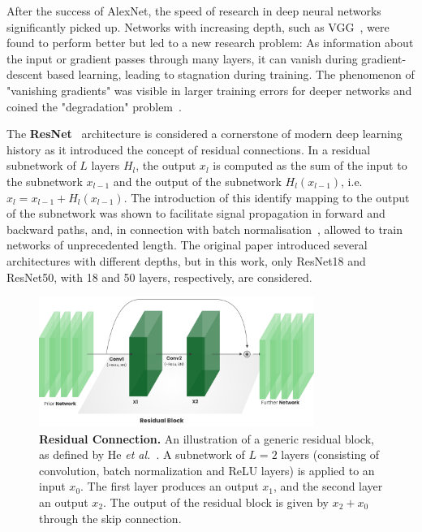 \documentclass[a4paper]{article}
\begin{document}
After the success of AlexNet, the speed of research in deep neural networks
significantly picked up. Networks with increasing depth, such as VGG~\cite{vgg},
were found to perform better  but led to a new research problem: As information
about the input or gradient passes through many layers, it can vanish during
gradient-descent based learning, leading to stagnation during training. The
phenomenon of "vanishing gradients" was visible in larger training errors for
deeper networks and coined the "degradation" problem~\cite{resnet}. 

The \textbf{ResNet}~\cite{resnet} architecture is considered a cornerstone of
modern deep learning history as it introduced the concept of residual
connections. In a residual subnetwork of $L$ layers $H_l$, the output $x_l$ is
computed as the sum of the input to the subnetwork $x_{l-1}$ and the output of
the subnetwork $H_l(x_{l-1})$, i.e. $x_l=x_{l-1}+H_l(x_{l-1})$. The introduction
of this identify mapping to the output of the subnetwork was shown to facilitate
signal propagation in forward and backward paths, and, in connection with batch
normalisation~\cite{batchnorm}, allowed to train networks of unprecedented
length. The original paper introduced several architectures with different
depths, but in this work, only ResNet18 and ResNet50, with 18 and 50 layers,
respectively, are considered.

\begin{figure}
  \centering
  \includegraphics[width=0.8\textwidth]{./figures/resnet.png}
  \caption{\textbf{Residual Connection.} An illustration of a generic residual
    block, as defined by He \textit{et al.}~\cite{resnet}. A subnetwork of $L=2$
    layers (consisting of convolution, batch normalization and ReLU layers) is
    applied to an input $x_0$. The first layer produces an output $x_1$, and the
  second layer an output $x_2$. The output of the residual block is given by
$x_2+x_0$ through the skip connection.}
  \label{fig:residual-connection}
\end{figure}
\end{document}
